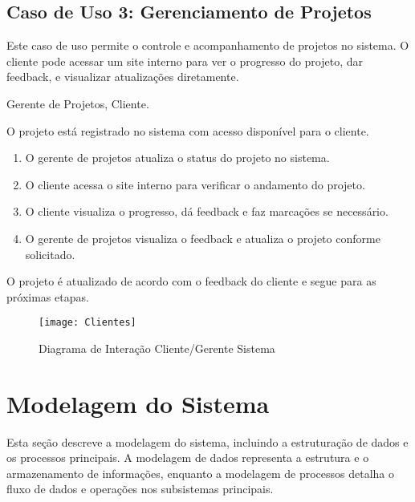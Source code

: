 \subsection{Caso de Uso 3: Gerenciamento de Projetos}
\begin{description}[style=nextline]
    \item[Descrição:] Este caso de uso permite o controle e acompanhamento de projetos no sistema. O cliente pode acessar um site interno para ver o progresso do projeto, dar feedback, e visualizar atualizações diretamente.
    
    \item[Atores:] Gerente de Projetos, Cliente.
    
    \item[Pré-condição:] O projeto está registrado no sistema com acesso disponível para o cliente.
    
    \item[Sequência de Ações:]
    \begin{enumerate}
        \item O gerente de projetos atualiza o status do projeto no sistema.
        \item O cliente acessa o site interno para verificar o andamento do projeto.
        \item O cliente visualiza o progresso, dá feedback e faz marcações se necessário.
        \item O gerente de projetos visualiza o feedback e atualiza o projeto conforme solicitado.
    \end{enumerate}
    
    \item[Pós-condição:] O projeto é atualizado de acordo com o feedback do cliente e segue para as próximas etapas.
\end{description}

\begin{figure}[ht]
    \centering
    \texttt{[image: Clientes]}
    \caption{Diagrama de Interação Cliente/Gerente Sistema}
    \label{fig:diagram1}
\end{figure}

\pagebreak
\newpage

\section{Modelagem do Sistema}

Esta seção descreve a modelagem do sistema, incluindo a estruturação de dados e os processos principais. A modelagem de dados representa a estrutura e o armazenamento de informações, enquanto a modelagem de processos detalha o fluxo de dados e operações nos subsistemas principais.

